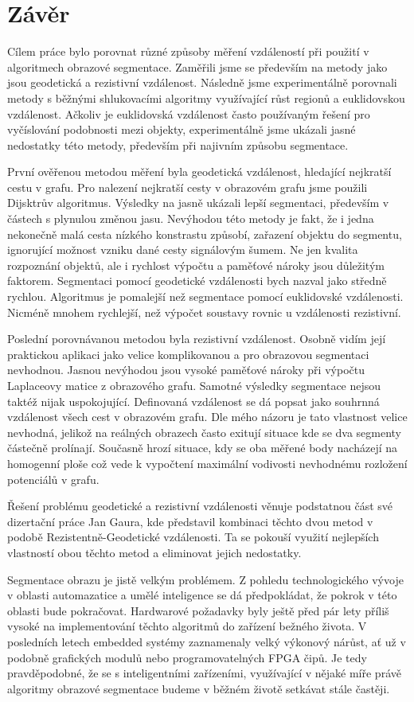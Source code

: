 \documentclass[czech, master, public, dept460, male, cpdeclaration, oneside]{diploma}
\begin{document}
\section*{Závěr}
Cílem práce bylo porovnat různé způsoby měření vzdáleností při použití v algoritmech obrazové segmentace. Zaměřili jsme se především na metody jako jsou geodetická a rezistivní vzdálenost. Následně jsme experimentálně porovnali metody s běžnými shlukovacími algoritmy využívající růst regionů a euklidovskou vzdálenost. Ačkoliv je euklidovská vzdálenost často používaným řešení pro vyčíslování podobnosti mezi objekty, experimentálně jsme ukázali jasné nedostatky této metody, především při najivním způsobu segmentace.\par
První ověřenou metodou měření byla geodetická vzdálenost, hledající nejkratší cestu v grafu. Pro nalezení nejkratší cesty v obrazovém grafu jsme použili Dijsktrův algoritmus. Výsledky na jasně ukázali lepší segmentaci, především v částech s plynulou změnou jasu. Nevýhodou této metody je fakt, že i jedna nekonečně malá cesta nízkého konstrastu způsobí, zařazení objektu do segmentu, ignorující možnost vzniku dané cesty signálovým šumem. Ne jen kvalita rozpoznání objektů, ale i rychlost výpočtu a paměťové nároky jsou důležitým faktorem. Segmentaci pomocí geodetické vzdálenosti bych nazval jako středně rychlou. Algoritmus je pomalejší než segmentace pomocí euklidovské vzdálenosti. Nicméně mnohem rychlejší, než výpočet soustavy rovnic u vzdálenosti rezistivní.\par
Poslední porovnávanou metodou byla rezistivní vzdálenost. Osobně vidím její praktickou aplikaci jako velice komplikovanou a pro obrazovou segmentaci nevhodnou. Jasnou nevýhodou jsou vysoké paměťové nároky při výpočtu Laplaceovy matice z obrazového grafu. Samotné výsledky segmentace nejsou taktéž nijak uspokojující. Definovaná vzdálenost se dá popsat jako souhrnná vzdálenost všech cest v obrazovém grafu. Dle mého názoru je tato vlastnost velice nevhodná, jelikož na reálných obrazech často exitují situace kde se dva segmenty částečně prolínají. Současně hrozí situace, kdy se oba měřené body nacházejí na homogenní ploše což vede k vypočtení maximální vodivosti nevhodnému rozložení potenciálů v grafu. \par
Řešení problému geodetické a rezistivní vzdálenosti věnuje podstatnou část své dizertační práce Jan Gaura, kde představil kombinaci těchto dvou metod v podobě Rezistentně-Geodetické vzdálenosti.\cite{Gaura} Ta se pokouší využití nejlepších vlastností obou těchto metod a eliminovat jejich nedostatky.\par
Segmentace obrazu je jistě velkým problémem. Z pohledu technologického vývoje v oblasti automazatice a umělé inteligence se dá předpokládat, že pokrok v této oblasti bude pokračovat. Hardwarové požadavky byly ještě před pár lety příliš vysoké na implementování těchto algoritmů do zařízení bežného života. V posledních letech embedded systémy zaznamenaly velký výkonový nárůst, ať už v podobně grafických modulů nebo programovatelných FPGA čipů. Je tedy pravděpodobné, že se s inteligentními zařízeními, využívající v nějaké míře právě algoritmy obrazové segmentace budeme v běžném životě setkávat stále častěji.
\end{document}
